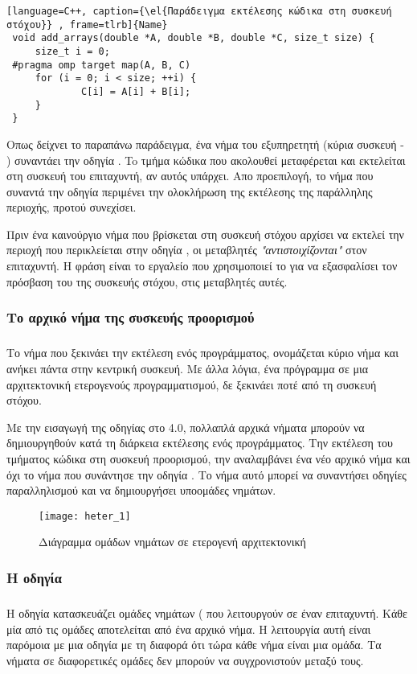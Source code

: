 \begin{lstlisting}[language=C++, caption={\el{Παράδειγμα εκτέλεσης κώδικα στη συσκευή στόχου}} , frame=tlrb]{Name}
 void add_arrays(double *A, double *B, double *C, size_t size) {
     size_t i = 0;
 #pragma omp target map(A, B, C)
     for (i = 0; i < size; ++i) {
             C[i] = A[i] + B[i];
     }
 }
\end{lstlisting}
\clearpage
Οπως δείχνει το παραπάνω παράδειγμα, ένα νήμα του εξυπηρετητή (κύρια συσκευή - \emph{}) συναντάει την οδηγία \emph{}. To τμήμα κώδικα που ακολουθεί μεταφέρεται και εκτελείται στη συσκευή του επιταχυντή, αν αυτός υπάρχει. Απο προεπιλογή, το νήμα που συναντά την οδηγία περιμένει την ολοκλήρωση της εκτέλεσης της παράλληλης περιοχής, προτού συνεχίσει.

Πριν ένα καινούργιο νήμα που βρίσκεται στη συσκευή στόχου αρχίσει να εκτελεί την περιοχή που περικλείεται στην οδηγία \emph{}, οι μεταβλητές  \emph{} \emph{"αντιστοιχίζονται"} στον επιταχυντή. Η φράση \emph{} είναι το εργαλείο που χρησιμοποιεί το \emph{} για να εξασφαλίσει τον πρόσβαση του της συσκευής στόχου, στις μεταβλητές αυτές.


\subsubsection{Το αρχικό νήμα της συσκευής προορισμού}
\subparagraph{}
Το νήμα που ξεκινάει την εκτέλεση ενός προγράμματος, ονομάζεται κύριο νήμα και ανήκει πάντα στην κεντρική συσκευή. Με άλλα λόγια, ένα πρόγραμμα σε μια αρχιτεκτονική ετερογενούς προγραμματισμού, δε ξεκινάει ποτέ από τη συσκευή στόχου.

Με την εισαγωγή της οδηγίας \emph{} στο \emph{} 4.0, πολλαπλά αρχικά νήματα μπορούν να δημιουργηθούν κατά τη διάρκεια εκτέλεσης ενός προγράμματος. Την εκτέλεση του τμήματος κώδικα στη συσκευή προορισμού, την αναλαμβάνει ένα νέο αρχικό νήμα και όχι το νήμα που συνάντησε την οδηγία \emph{}. Το νήμα αυτό μπορεί να συναντήσει οδηγίες παραλληλισμού και να δημιουργήσει υποομάδες νημάτων.
\ \\
\begin{figure}[h]
\texttt{[image: heter\_1]}
\centering
\captionsetup{justification=centering, singlelinecheck=false}
	\caption{Διάγραμμα ομάδων νημάτων σε ετερογενή αρχιτεκτονική}
\label{fig:heter_1}
\end{figure}
\clearpage
\subsubsection{H οδηγία \emph{}}
\subparagraph{}
Η οδηγία \emph{} κατασκευάζει ομάδες νημάτων (\emph{} που λειτουργούν σε έναν επιταχυντή. Κάθε μία από τις ομάδες αποτελείται από ένα αρχικό νήμα. Η λειτουργία αυτή είναι παρόμοια με μια οδηγία \emph{} με τη διαφορά ότι τώρα κάθε νήμα είναι μια ομάδα. Τα νήματα σε διαφορετικές ομάδες δεν μπορούν να συγχρονιστούν μεταξύ τους.


